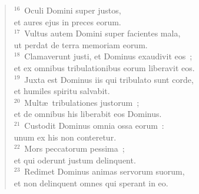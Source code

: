 \begin{flushleft}
\begin{verse}
${}^{16}$~Oculi Domini super justos,\\ et aures ejus in preces eorum.\\
${}^{17}$~Vultus autem Domini super facientes mala,\\ ut perdat de terra memoriam eorum.\\
${}^{18}$~Clamaverunt justi, et Dominus exaudivit eos~;\\ et ex omnibus tribulationibus eorum liberavit eos.\\
${}^{19}$~Juxta est Dominus iis qui tribulato sunt corde,\\ et humiles spiritu salvabit.\\
${}^{20}$~Mult\ae\ tribulationes justorum~;\\ et de omnibus his liberabit eos Dominus.\\
${}^{21}$~Custodit Dominus omnia ossa eorum~:\\ unum ex his non conteretur.\\
${}^{22}$~Mors peccatorum pessima~;\\ et qui oderunt justum delinquent.\\
${}^{23}$~Redimet Dominus animas servorum suorum,\\ et non delinquent omnes qui sperant in eo.\end{verse}\end{flushleft}


